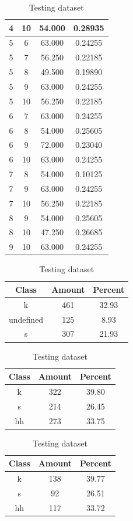 \begin{table}
\begin{subtable}[h]{0.45\textwidth}
{\begin{tabular}{|c|c|c|c|}
 4 & 10 & 54.000 & 0.28935\\ \hline 
 5 & 6 & 63.000 & 0.24255\\ \hline 
 5 & 7 & 56.250 & 0.22185\\ \hline 
 5 & 8 & 49.500 & 0.19890\\ \hline 
 5 & 9 & 63.000 & 0.24255\\ \hline 
 5 & 10 & 56.250 & 0.22185\\ \hline 
 6 & 7 & 63.000 & 0.24255\\ \hline
 6 & 8 & 54.000 & 0.25605\\ \hline 
 6 & 9 & 72.000 & 0.23040\\ \hline 
 6 & 10 & 63.000 & 0.24255\\ \hline 
 7 & 8 & 54.000 & 0.10125\\ \hline 
 7 & 9 & 63.000 & 0.24255\\ \hline 
 7 & 10 & 56.250 & 0.22185\\ \hline 
 8 & 9 & 54.000 & 0.25605\\ \hline 
 8 & 10 & 47.250 & 0.26685\\ \hline 
 9 & 10 & 63.000 & 0.24255\\ \hline 

\end{tabular}
}\label{xlsflux2010}
\caption{xcsflux2010}
\end{subtable}

\begin{subtable}[h]{0.45\textwidth}
\centering
\begin{tabular}{|c|c|c|}
\hline
Class & Amount & Percent\\ \hline
k & 461 & 32.93\\ \hline
undefined & 125 & 8.93\\ \hline
s & 307 & 21.93\\ \hline
\end{tabular}
\caption{Entire dataset after stripping short sounds}
\end{subtable}
\hfill
\begin{subtable}[h]{0.45\textwidth}
\centering
\begin{tabular}{|c|c|c|}
\hline
Class & Amount & Percent\\ \hline
k & 322 & 39.80\\ \hline
s & 214 & 26.45\\ \hline
hh & 273 & 33.75\\ \hline
\end{tabular}
\caption{Training dataset}
\end{subtable}
\hfill
\begin{subtable}[h]{0.45\textwidth}
\centering
\begin{tabular}{|c|c|c|}
\hline
Class & Amount & Percent\\ \hline
k & 138 & 39.77\\ \hline
s & 92 & 26.51\\ \hline
hh & 117 & 33.72\\ \hline
\end{tabular}
\caption{Testing dataset}
\end{subtable}
\hfill


\end{table}

